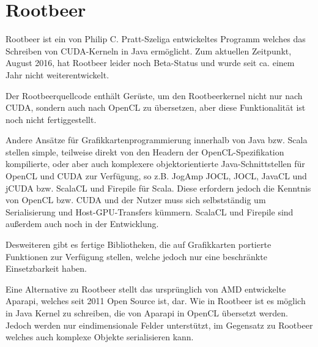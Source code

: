 
\chapter{Rootbeer}
\label{sct:rootbeer}

Rootbeer\cite{pratt2012rootbeer} ist ein von Philip C. Pratt-Szeliga entwickeltes Programm welches das Schreiben von CUDA-Kerneln in Java ermöglicht.
Zum aktuellen Zeitpunkt, August 2016, hat Rootbeer leider noch Beta-Status und wurde seit ca. einem Jahr nicht weiterentwickelt\cite{rootbeergithub}.

Der Rootbeerquellcode enthält Gerüste, um den Rootbeerkernel nicht nur nach CUDA, sondern auch nach OpenCL zu übersetzen, aber diese Funktionalität ist noch nicht fertiggestellt.

Andere Ansätze für Grafikkartenprogrammierung innerhalb von Java bzw. Scala stellen simple, teilweise direkt von den Headern der OpenCL-Spezifikation kompilierte, oder aber auch komplexere objektorientierte Java-Schnittstellen für OpenCL und CUDA zur Verfügung, so z.B. JogAmp JOCL\cite{jogampcl}, JOCL\cite{jocl}, JavaCL\cite{javacl} und jCUDA\cite{jcuda} bzw. ScalaCL\cite{scalacl} und Firepile\cite{firepile} für Scala.
Diese erfordern jedoch die Kenntnis von OpenCL bzw. CUDA und der Nutzer muss sich selbstständig um Serialisierung und Host-GPU-Transfers kümmern.
ScalaCL und Firepile sind außerdem auch noch in der Entwicklung.

Desweiteren gibt es fertige Bibliotheken, die auf Grafikkarten portierte Funktionen zur Verfügung stellen, welche jedoch nur eine beschränkte Einsetzbarkeit haben.

Eine Alternative zu Rootbeer stellt das ursprünglich von AMD entwickelte Aparapi\cite{aparapi}, welches seit 2011 Open Source ist, dar.
Wie in Rootbeer ist es möglich in Java Kernel zu schreiben, die von Aparapi in OpenCL übersetzt werden.
Jedoch werden nur eindimensionale Felder unterstützt, im Gegensatz zu Rootbeer welches auch komplexe Objekte serialisieren kann.\\




